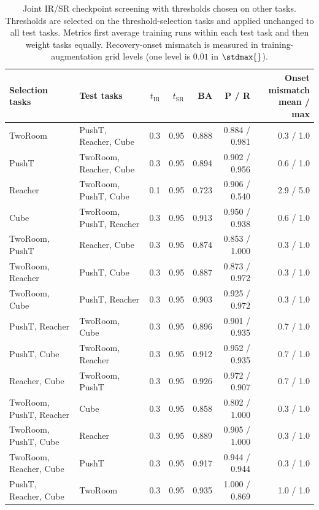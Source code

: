 \begin{table}[t]
\centering
\caption{Joint IR/SR checkpoint screening with thresholds chosen on other tasks. Thresholds are selected on the threshold-selection tasks and applied unchanged to all test tasks. Metrics first average training runs within each test task and then weight tasks equally. Recovery-onset mismatch is measured in training-augmentation grid levels (one level is $0.01$ in $\stdmax{}$).}
\label{tab:cross-task-all-subsets}
\small
\setlength{\tabcolsep}{3.5pt}
\begin{tabular}{>{\raggedright\arraybackslash}p{}>{\raggedright\arraybackslash}p{}rrrrr}
\toprule
Selection tasks & Test tasks & $t_{\mathrm{IR}}$ & $t_{\mathrm{SR}}$ & BA & P / R & \shortstack{Onset mismatch\\mean / max} \\
\midrule
TwoRoom & PushT, Reacher, Cube & 0.3 & 0.95 & 0.888 & 0.884 / 0.981 & 0.3 / 1.0 \\
PushT & TwoRoom, Reacher, Cube & 0.3 & 0.95 & 0.894 & 0.902 / 0.956 & 0.6 / 1.0 \\
Reacher & TwoRoom, PushT, Cube & 0.1 & 0.95 & 0.723 & 0.906 / 0.540 & 2.9 / 5.0 \\
Cube & TwoRoom, PushT, Reacher & 0.3 & 0.95 & 0.913 & 0.950 / 0.938 & 0.6 / 1.0 \\
TwoRoom, PushT & Reacher, Cube & 0.3 & 0.95 & 0.874 & 0.853 / 1.000 & 0.3 / 1.0 \\
TwoRoom, Reacher & PushT, Cube & 0.3 & 0.95 & 0.887 & 0.873 / 0.972 & 0.3 / 1.0 \\
TwoRoom, Cube & PushT, Reacher & 0.3 & 0.95 & 0.903 & 0.925 / 0.972 & 0.3 / 1.0 \\
PushT, Reacher & TwoRoom, Cube & 0.3 & 0.95 & 0.896 & 0.901 / 0.935 & 0.7 / 1.0 \\
PushT, Cube & TwoRoom, Reacher & 0.3 & 0.95 & 0.912 & 0.952 / 0.935 & 0.7 / 1.0 \\
Reacher, Cube & TwoRoom, PushT & 0.3 & 0.95 & 0.926 & 0.972 / 0.907 & 0.7 / 1.0 \\
TwoRoom, PushT, Reacher & Cube & 0.3 & 0.95 & 0.858 & 0.802 / 1.000 & 0.3 / 1.0 \\
TwoRoom, PushT, Cube & Reacher & 0.3 & 0.95 & 0.889 & 0.905 / 1.000 & 0.3 / 1.0 \\
TwoRoom, Reacher, Cube & PushT & 0.3 & 0.95 & 0.917 & 0.944 / 0.944 & 0.3 / 1.0 \\
PushT, Reacher, Cube & TwoRoom & 0.3 & 0.95 & 0.935 & 1.000 / 0.869 & 1.0 / 1.0 \\
\bottomrule
\end{tabular}
\end{table}
